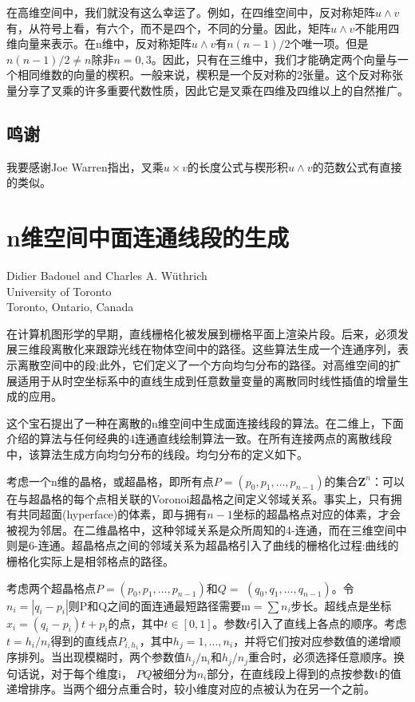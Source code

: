 \begin{CJK}{UTF8}{gbsn}
在高维空间中，我们就没有这么幸运了。例如，在四维空间中，反对称矩阵$u \wedge v$有，从符号上看，有六个，而不是四个，不同的分量。因此，矩阵$u \wedge v$不能用四维向量来表示。在$\mathrm{n}$维中，反对称矩阵$u \wedge v$有$n(n-1) / 2$个唯一项。但是$n(n-1) / 2 \neq n $除非$n=0,3$。因此，只有在三维中，我们才能确定两个向量与一个相同维数的向量的楔积。一般来说，楔积是一个反对称的2张量。这个反对称张量分享了叉乘的许多重要代数性质，因此它是叉乘在四维及四维以上的自然推广。

\subsection*{鸣谢}
我要感谢Joe Warren指出，叉乘$u \times v$的长度公式与楔形积$u \wedge v$的范数公式有直接的类似。


\newpage
\section{n维空间中面连通线段的生成}
\begin{center}
\small{
Didier Badouel and Charles A. W\"uthrich\\
University of Toronto\\
Toronto, Ontario, Canada}
\end{center}

在计算机图形学的早期，直线栅格化被发展到栅格平面上渲染片段。后来，必须发展三维段离散化来跟踪光线在物体空间中的路径。这些算法生成一个连通序列，表示离散空间中的段;此外，它们定义了一个方向均匀分布的路径。对高维空间的扩展适用于从时空坐标系中的直线生成到任意数量变量的离散同时线性插值的增量生成的应用。

这个宝石提出了一种在离散的n维空间中生成面连接线段的算法。在二维上，下面介绍的算法与任何经典的4连通直线绘制算法一致。在所有连接两点的离散线段中，该算法生成方向均匀分布的线段。均匀分布的定义如下。

考虑一个n维的晶格，或超晶格，即所有点$P=\left(p _{0}, p _{1}, \ldots, p _{n-1}\right)$的集合$\mathbf{Z}^{n}$：可以在与超晶格的每个点相关联的Voronoi超晶格之间定义邻域关系。事实上，只有拥有共同超面(hyperface)的体素，即与拥有$n-1$坐标的超晶格点对应的体素，才会被视为邻居。在二维晶格中，这种邻域关系是众所周知的4-连通，而在三维空间中则是6-连通。超晶格点之间的邻域关系为超晶格引入了曲线的栅格化过程:曲线的栅格化实际上是相邻格点的路径。

考虑两个超晶格点$P=\left(p_{0}, p_{1}, \ldots, p_{n-1}\right)$和$Q=$ $\left(q_{0}, q_{1}, \ldots, q_{n-1}\right)$。令$n_{i}=\left|q_{i}-p_{i}\right|$则$\mathrm{P}$和$\mathrm{Q}$之间的面连通最短路径需要$\mathrm{m}=\sum n_i$步长。超线点是坐标$x_{i}=\left(q_{i}-p_{i}\right) t+p_{i}$的点，其中$t \in[0,1]$。参数$t$引入了直线上各点的顺序。考虑$t=h_{i} / n_{i}$得到的直线点$P_{i, h_{1}}$，其中$h_{j}=1, \ldots, n_{i}$，并将它们按对应参数值的递增顺序排列。当出现模糊时，两个参数值$h_{j} / \mathrm{n}_{i}$和$h_{j} / n_{j}$重合时，必须选择任意顺序。换句话说，对于每个维度i， $PQ$被细分为$n_{i}$部分，在直线段上得到的点按参数t的值递增排序。当两个细分点重合时，较小维度对应的点被认为在另一个之前。


\end{CJK}
